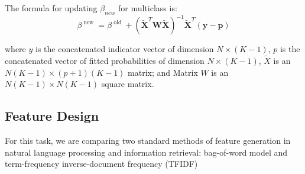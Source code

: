 The formula for updating $\beta_{new}$ for multiclass is:
$$\beta ^ { \text { new } } = \beta ^ { \text { old } } + \left( \tilde { \mathbf { X } } ^ { T } \mathbf { W } \tilde { \mathbf { X } } \right) ^ { - 1 } \tilde { \mathbf { X } } ^ { T } ( \mathbf { y } - \mathbf { p } )$$

where $y$ is the concatenated indicator vector of dimension $N \times (K-1)$, $p$ is the concatenated vector of fitted probabilities of dimension $N \times (K-1)$, $\tilde{X}$ is an $N(K-1)\times (p+1)(K-1)$ matrix; and Matrix $W$ is an $N(K-1)\times N(K-1)$ square matrix.

\subsection{Feature Design}

For this task, we are comparing two standard methods of feature generation in natural language processing and information retrieval: bag-of-word model and term-frequency inverse-document frequency (TFIDF)

%
%





